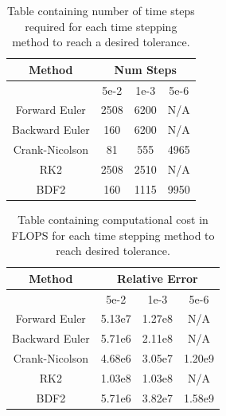 \documentclass[12pt]{article}
\begin{document}
    \begin{table}[h]
    \centering
    \begin{tabular}{|c|c|c|c|}
    \hline
    \multicolumn{1}{|c|}{Method} & \multicolumn{3}{c|}{Num Steps} \\ \hline
     & 5e-2 & 1e-3 & 5e-6 \\ \hline
    Forward Euler & 2508 & 6200 & N/A \\ \hline
    Backward Euler & 160 & 6200 & N/A \\ \hline
    Crank-Nicolson & 81 & 555 & 4965 \\ \hline
    RK2 & 2508 & 2510 &  N/A\\ \hline
    BDF2 & 160 & 1115 & 9950 \\ \hline
    \end{tabular}
    \caption{Table containing number of time steps required for each time stepping method to reach a desired tolerance.}
    \label{tab:example}
    \end{table}

    \begin{table}[h]
    \centering
    \begin{tabular}{|c|c|c|c|}
    \hline
    \multicolumn{1}{|c|}{Method} & \multicolumn{3}{c|}{Relative Error} \\ \hline
     & 5e-2 & 1e-3 & 5e-6 \\ \hline
    Forward Euler & 5.13e7 & 1.27e8 & N/A \\ \hline
    Backward Euler & 5.71e6 & 2.11e8 & N/A \\ \hline
    Crank-Nicolson & 4.68e6 & 3.05e7 & 1.20e9 \\ \hline
    RK2 & 1.03e8 & 1.03e8 & N/A \\ \hline
    BDF2 & 5.71e6 & 3.82e7 & 1.58e9 \\ \hline
    \end{tabular}
    \caption{Table containing computational cost in FLOPS for each time stepping method to reach desired tolerance.}
    \label{tab:example}
    \end{table}
\end{document}
